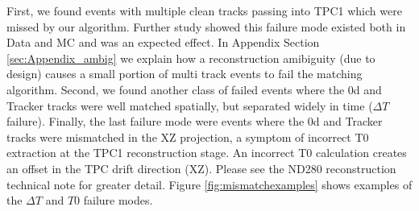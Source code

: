 First, we found events with multiple clean tracks passing into TPC1 which were missed by our algorithm. Further study showed this failure mode existed both in Data and MC and was an expected effect. In Appendix Section \ref{sec:Appendix_ambig} we explain how a reconstruction amibiguity (due to design) causes a small portion of multi track events to fail the matching algorithm. Second, we found another class of failed events where the \p0d and Tracker tracks were well matched spatially, but separated widely in time ($\Delta T$ failure). Finally, the last failure mode were events where the \p0d and Tracker tracks were mismatched in the XZ projection, a symptom of incorrect T0 extraction at the TPC1 reconstruction stage. An incorrect T0 calculation creates an offset in the TPC drift direction (XZ). Please see the ND280 reconstruction technical note \cite{tn72} for greater detail. Figure \ref{fig:mismatchexamples} shows examples of the $\Delta T$ and $T0$ failure modes.

